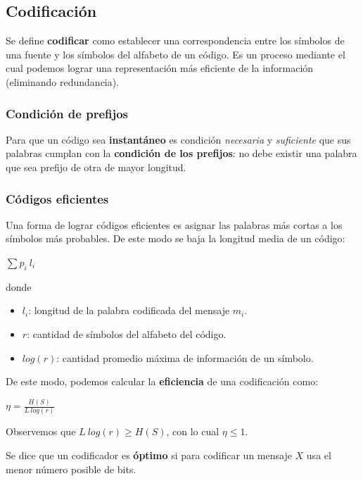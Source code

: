 \documentclass[]{article}
\begin{document}
\subsection{Codificación}
Se define \textbf{codificar} como establecer una correspondencia entre los símbolos de una fuente y los símbolos del alfabeto de un código. Es un proceso mediante el cual podemos lograr una representación más eficiente de la información (eliminando redundancia).

\subsubsection{Condición de prefijos}
Para que un código sea \textbf{instantáneo} es condición \emph{necesaria} y \emph{suficiente} que sus palabras cumplan con la \textbf{condición de los prefijos}: no debe existir una palabra que sea prefijo de otra de mayor longitud.

\subsubsection{Códigos eficientes}
Una forma de lograr códigos eficientes es asignar las palabras más cortas a los símbolos más probables. De este modo se baja la longitud media de un código:
\begin{center}
    $\displaystyle \sum p_i\ l_i$
\end{center}
donde
\begin{itemize}
    \item $l_i$: longitud de la palabra codificada del mensaje $m_i$.
    \item $r$: cantidad de símbolos del alfabeto del código.
    \item $log(r)$: cantidad promedio máxima de información de un símbolo.
\end{itemize}

De este modo, podemos calcular la \textbf{eficiencia} de una codificación como:

\begin{center}
    $\eta = \displaystyle \frac{H(S)}{L\ log(r)}$
\end{center}

Observemos que $L\ log(r) \geq H(S)$, con lo cual $\eta \leq 1$.

Se dice que un codificador es \textbf{óptimo} si para codificar un mensaje $X$ usa el menor número posible de bits.
\end{document}
